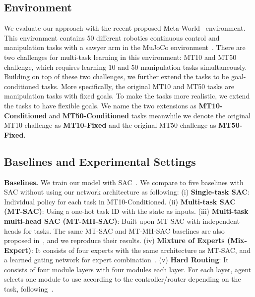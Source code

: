 \documentclass{article}
\begin{document}
\vspace{-0.07in}
\subsection{Environment}
\vspace{-0.07in}
We evaluate our approach with the recent proposed Meta-World~\cite{yu2019meta} environment. This environment contains 50 different robotics continuous control and manipulation tasks with a sawyer arm in the MuJoCo environment~\cite{todorov2012mujoco}. There are two challenges for multi-task learning in this environment: MT10 and MT50 challenge, which requires learning 10 and 50 manipulation tasks simultaneously. Building on top of these two challenges, we further extend the tasks to be goal-conditioned tasks. More specifically, the original MT10 and MT50 tasks are manipulation tasks with fixed goals. To make the tasks more realistic, we extend the tasks to have flexible goals. We name the two extensions as \textbf{MT10-Conditioned} and \textbf{MT50-Conditioned} tasks meanwhile we denote the original MT10 challenge as \textbf{MT10-Fixed} and the original MT50 challenge as \textbf{MT50-Fixed}.
 





\vspace{-0.07in}
\subsection{Baselines and Experimental Settings}
\vspace{-0.07in}

\textbf{Baselines.} We train our model with SAC~\cite{DBLP:journals/corr/abs-1801-01290}. We compare to five baselines with SAC without using our network architecture as following: (i) \textbf{Single-task SAC}: Individual policy for each task in MT10-Conditioned.
(ii) \textbf{Multi-task SAC (MT-SAC)}: Using a one-hot task ID with the state as inputs. (iii) \textbf{Multi-task multi-head SAC (MT-MH-SAC)}: Built upon MT-SAC with independent heads for tasks. The same MT-SAC and MT-MH-SAC baselines are also proposed in~\cite{yu2019meta}, and we reproduce their results. (iv) \textbf{Mixture of Experts (Mix-Expert)}: It consists of four experts with the same architecture as MT-SAC, and a learned gating network for expert combination~\cite{jacobs1991}. (v) \textbf{Hard Routing}: It consists of four module layers with four modules each layer. For each layer, agent selects one module to use according to the controller/router depending on the task, following~\cite{rosenbaum2017routing}.
\end{document}
